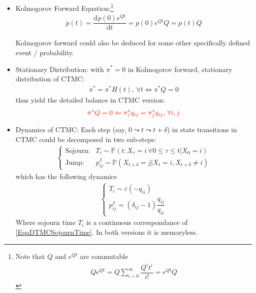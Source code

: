 \begin{itemize}[topsep=2pt,itemsep=0pt]
    Comment: with Gershgorin Circle Theorem \footnote{Detail see \url{https://v1ncent19.github.io/texts/DiagonalDominant/}.}, $ Q $ as a diagonal dominant matrix, is negative definite, which guarentee the convergence of $ H(t)=e^{Qt}<\infty $
    \item Kolmogorov Forward Equation:\footnote{Note that $ Q $ and $ e^{Qt} $ are commutable
    \begin{align}
         Qe^{Qt}=Q\sum_{i=0}^\infty\dfrac{Q^it^i}{i!}=e^{Qt}Q
    \end{align}
    }
    \begin{align}
        \dot{p}(t)=\dfrac{\mathrm{d}^{} p(0)e^{Qt}}{\mathrm{d}t}=p(0)e^{Qt}Q=p(t)Q
    \end{align}

    Kolmogorov forward could also be deduced for some other specifically defined event / probability. 
    \item Stationary Distribution: with $ \dot{\pi}^*=0 $ in Kolmogorov forward, stationary distribution of CTMC:
    \begin{align}
         \pi^*=\pi^*H(t),\,\forall t\Leftrightarrow \pi^*Q=0
    \end{align}
    thus yield the detailed balance in CTMC version:
    \begin{align}
         \color{red}\pi^*Q=0\Leftarrow \pi^*_iq_{ij}=\pi^*_jq_{ij},\,\forall i,j
    \end{align}
    \item Dynamics of CTMC: Each step (say, $ 0\leadsto t\leadsto t+\delta  $) in state transitions in CTMC could be decomposed in two sub-steps:
    \begin{align}
        \begin{cases}
            \text{Sojourn}:&T_i\sim \mathbb{P}\left(t: X_\tau=i\,\forall 0\leq \tau\leq t\big| X_0=i \right)\\
            \text{Jump}:&p_{ij}^\mathrm{J}\sim  \mathbb{P}\left( X_{t+\delta}=j\big| X_t=i,X_{t+\delta }\neq i\right) 
        \end{cases}
    \end{align}
    which has the following dynamics
    \begin{align}
        \begin{cases}
            T_i\sim \varepsilon (-q_{ii})\\
            p_{ij}^\mathrm{J}=(\delta _{ij}-1)\dfrac{q_{ij}}{q_{ii}} 
        \end{cases} 
    \end{align}
    Where sojourn time $ T_i $ is a continuous correspondance of \ref{EqaDTMCSojournTime}. In both versions it is memoryless.
\end{itemize}

